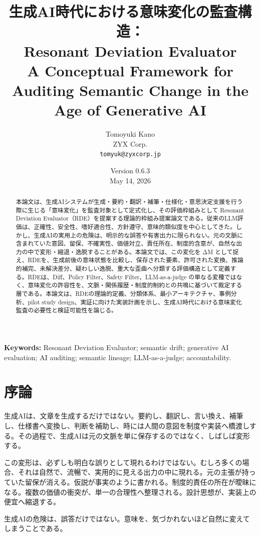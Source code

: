 \documentclass[
  a4paper]{ltjsarticle}
\title{生成AI時代における意味変化の監査構造：\\Resonant Deviation Evaluator\\\large A Conceptual Framework for Auditing Semantic Change in the Age of Generative AI}
\author{Tomoyuki Kano\\ZYX Corp.\\\texttt{tomyuk@zyxcorp.jp}}
\date{Version 0.6.3\\May 14, 2026}
\begin{document}
\maketitle

\begin{abstract}

本論文は、生成AIシステムが生成・要約・翻訳・補筆・仕様化・意思決定支援を行う際に生じる「意味変化」を監査対象として定式化し、その評価枠組みとして
Resonant Deviation
Evaluator（RDE）を提案する理論的枠組み提案論文である。従来のLLM評価は、正確性、安全性、嗜好適合性、方針遵守、意味的類似度を中心としてきた。しかし、生成AIの実用上の危険は、明示的な誤答や有害出力に限られない。元の文脈に含まれていた意図、留保、不確実性、価値対立、責任所在、制度的含意が、自然な出力の中で変形・縮退・逸脱することがある。本論文では、この変化を
ΔM
として捉え、RDEを、生成前後の意味状態を比較し、保存された要素、許可された変換、推論的補完、未解決差分、疑わしい逸脱、重大な歪曲へ分類する評価構造として定義する。RDEは、Diff、Policy
Filter、Safety Filter、LLM-as-a-judge
の単なる変種ではなく、意味変化の許容性を、文脈・関係履歴・制度的制約との共鳴に基づいて裁定する層である。本論文は、RDEの理論的定義、分類体系、最小アーキテクチャ、事例分析、pilot
study
design、実証に向けた実装計画を示し、生成AI時代における意味変化監査の必要性と検証可能性を論じる。

\end{abstract}

\noindent\textbf{Keywords:} Resonant Deviation Evaluator; semantic drift; generative AI evaluation; AI auditing; semantic lineage; LLM-as-a-judge; accountability.

\section{序論}\label{introduction}

生成AIは、文章を生成するだけではない。要約し、翻訳し、言い換え、補筆し、仕様書へ変換し、判断を補助し、時には人間の意図を制度や実装へ橋渡しする。その過程で、生成AIは元の文脈を単に保存するのではなく、しばしば変形する。

この変形は、必ずしも明白な誤りとして現れるわけではない。むしろ多くの場合、それは自然で、流暢で、実用的に見える出力の中に現れる。元の主張が持っていた留保が消える。仮説が事実のように書かれる。制度的責任の所在が曖昧になる。複数の価値の衝突が、単一の合理性へ整理される。設計思想が、実装上の便宜へ縮退する。

生成AIの危険は、誤答だけではない。意味を、気づかれないほど自然に変えてしまうことである。
\end{document}
